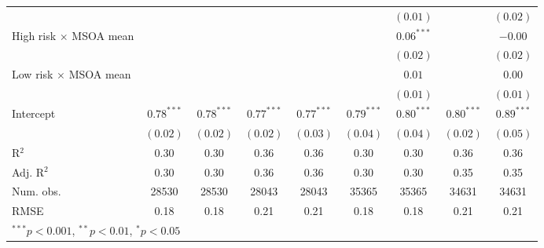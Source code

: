 \documentclass[12pt, letter]{scrartcl}
\begin{document}
\begin{tiny}
\begin{longtable}{lcccccccc}
                                            &               &               &               &               &               & $(0.01)$      &               & $(0.02)$      \\
High risk $\times$ MSOA mean                &               &               &               &               &               & $0.06^{***}$  &               & $-0.00$       \\
                                            &               &               &               &               &               & $(0.02)$      &               & $(0.02)$      \\
Low risk $\times$ MSOA mean                 &               &               &               &               &               & $0.01$        &               & $0.00$        \\
                                            &               &               &               &               &               & $(0.01)$      &               & $(0.01)$      \\
Intercept                                   & $0.78^{***}$  & $0.78^{***}$  & $0.77^{***}$  & $0.77^{***}$  & $0.79^{***}$  & $0.80^{***}$  & $0.80^{***}$  & $0.89^{***}$  \\
                                            & $(0.02)$      & $(0.02)$      & $(0.02)$      & $(0.03)$      & $(0.04)$      & $(0.04)$      & $(0.02)$      & $(0.05)$      \\
\hline
R$^2$                                       & 0.30          & 0.30          & 0.36          & 0.36          & 0.30          & 0.30          & 0.36          & 0.36          \\
Adj. R$^2$                                  & 0.30          & 0.30          & 0.36          & 0.36          & 0.30          & 0.30          & 0.35          & 0.35          \\
Num. obs.                                   & 28530         & 28530         & 28043         & 28043         & 35365         & 35365         & 34631         & 34631         \\
RMSE                                        & 0.18          & 0.18          & 0.21          & 0.21          & 0.18          & 0.18          & 0.21          & 0.21          \\
\toprule[1.5pt]
\multicolumn{9}{l}{\scriptsize{$^{***}p<0.001$, $^{**}p<0.01$, $^*p<0.05$}}
\end{longtable}
\end{tiny}
\end{document}
